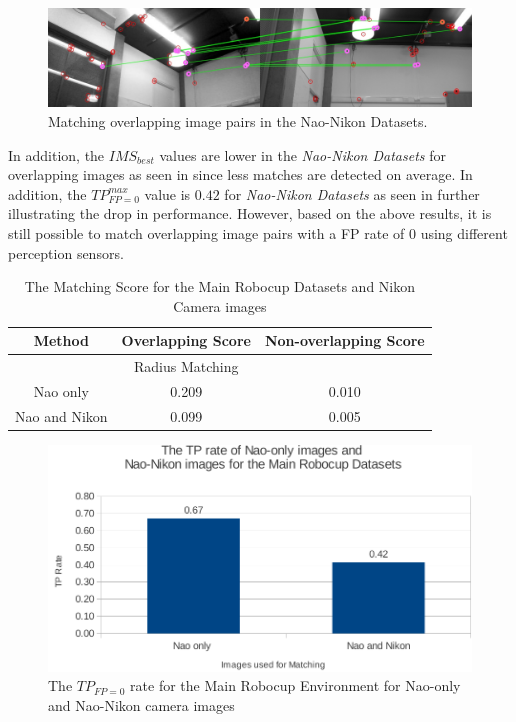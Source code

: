 \documentclass[11pt]{report}
\begin{document}
\begin{figure}[h!] 
  \centering
    \includegraphics[width=1.0\textwidth]{../Drawings/Matching/NaoNikonRobocupDataset.jpg}
    \caption{Matching overlapping image pairs in the Nao-Nikon Datasets.}
    \label{fig:mrd_nikon_match}
\end{figure}


In addition, the $IMS_{best}$ values are lower in the \textit{Nao-Nikon Datasets} for overlapping images as seen in  since less matches are detected on average. In addition, the $TP_{FP=0}^{max}$ value is $0.42$ for \textit{Nao-Nikon Datasets} as seen in  further illustrating the drop in performance. However, based on the above results, it is still possible to match overlapping image pairs with a FP rate of $0$ using different perception sensors.\\

\begin{table}
\centering
\caption{The Matching Score for the Main Robocup Datasets and Nikon Camera
images}
\begin{tabular}{|c|c|c|}
\hline 
Method & Overlapping Score & Non-overlapping Score\tabularnewline
\hline 
\hline 
 & Radius Matching & \tabularnewline
\hline 
Nao only & 0.209 & 0.010\tabularnewline
\hline 
Nao and Nikon & 0.099 & 0.005\tabularnewline
\hline 
\end{tabular}
\label{tab:ms_nikon_mrd}
\end{table}


\begin{figure}[h!] 
  \centering
    \includegraphics[width=1.0\textwidth]{../Drawings/Graphs/tp_rate_nikon_mrd.pdf}
    \caption{The $TP_{FP=0}$ rate for the Main Robocup Environment for Nao-only and Nao-Nikon camera images}
    \label{fig:tp_rate_nikon_mrd}
\end{figure}
\end{document}
